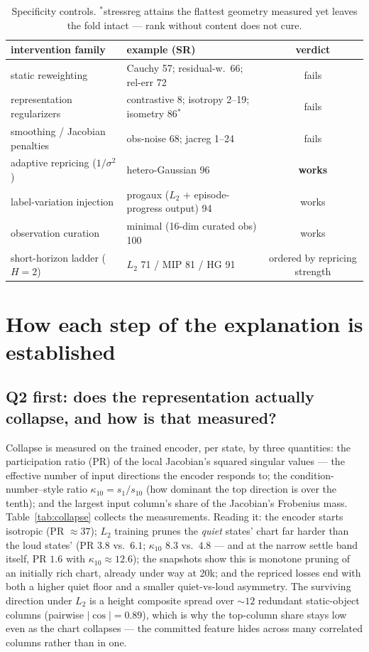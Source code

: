 \documentclass[11pt]{article}
\begin{document}
\begin{table}[h]\centering\small
\begin{tabular}{llc}
\toprule
intervention family & example (SR) & verdict \\
\midrule
static reweighting & Cauchy 57; residual-w.\ 66; rel-err 72 & fails \\
representation regularizers & contrastive 8; isotropy 2--19; isometry 86$^{*}$ & fails \\
smoothing / Jacobian penalties & obs-noise 68; jacreg 1--24 & fails \\
adaptive repricing ($1/\sigma^2$) & hetero-Gaussian 96 & \textbf{works} \\
label-variation injection & progaux ($L_2$ + episode-progress output) 94 & works \\
observation curation & minimal (16-dim curated obs) 100 & works \\
short-horizon ladder ($H{=}2$) & $L_2$ 71 / MIP 81 / HG 91 & ordered by repricing strength \\
\bottomrule
\end{tabular}
\caption{Specificity controls. $^{*}$stressreg attains the flattest geometry
measured yet leaves the fold intact --- rank without content does not cure.}
\label{tab:controls}
\end{table}


\section*{How each step of the explanation is established}

\subsection*{Q2 first: does the representation actually collapse, and how is that measured?}
Collapse is measured on the trained encoder, per state, by three quantities:
the participation ratio (PR) of the local Jacobian's squared singular values
--- the effective number of input directions the encoder responds to; the
condition-number--style ratio $\kappa_{10} = s_1/s_{10}$ (how dominant the
top direction is over the tenth); and the largest input column's share of the
Jacobian's Frobenius mass. Table~\ref{tab:collapse} collects the
measurements. Reading it: the encoder starts isotropic (PR $\approx 37$);
$L_2$ training prunes the \emph{quiet} states' chart far harder than the loud
states' (PR $3.8$ vs.\ $6.1$; $\kappa_{10}$ $8.3$ vs.\ $4.8$ --- and at the
narrow settle band itself, PR $1.6$ with $\kappa_{10} \approx 12.6$); the
snapshots show this is monotone pruning of an initially rich chart, already
under way at 20k; and the repriced losses end with both a higher quiet floor
and a smaller quiet-vs-loud asymmetry. The surviving direction under $L_2$ is
a height composite spread over ${\sim}12$ redundant static-object columns
(pairwise $|\cos| = 0.89$), which is why the top-column share stays low even
as the chart collapses --- the committed feature hides across many correlated
columns rather than in one.
\end{document}
